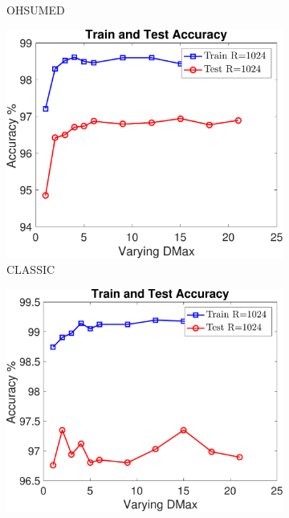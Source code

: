 \documentclass[11pt,a4paper]{article}
\newcommand{\1}{\boldsymbol{1}}
\begin{document}
\begin{figure}[htb]
\begin{subfigure}[b]{0.23\textwidth}
      \caption{OHSUMED}
      \label{App:fig:exptsA_varyingD_ohsumed}
      \end{subfigure}
      \begin{subfigure}[b]{0.23\textwidth}
      \includegraphics[width=\textwidth]{Graphs/wmdk_varyingD/classic_Accu_VaryingD_CV_R1024_dataSplit1-eps-converted-to.pdf}
      \caption{CLASSIC}
      \label{App:fig:exptsA_varyingD_classic}
      \end{subfigure}
      \begin{subfigure}[b]{0.23\textwidth}
      \includegraphics[width=\textwidth]{Graphs/wmdk_varyingD/r8_Accu_VaryingD_CV_R1024_dataSplit1-eps-converted-to.pdf}

\end{subfigure}
\end{figure}
\end{document}
